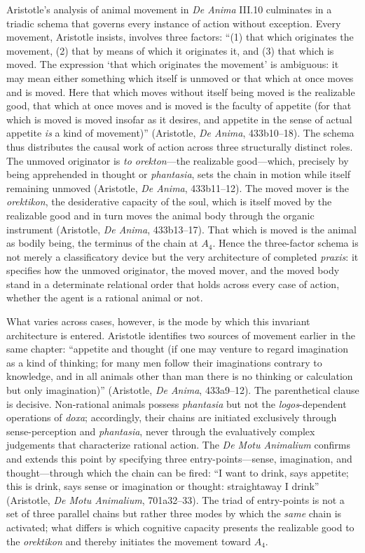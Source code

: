 Aristotle's analysis of animal movement in \textit{De Anima} III.10 culminates in a triadic schema that governs every instance of action without exception. Every movement, Aristotle insists, involves three factors: ``(1) that which originates the movement, (2) that by means of which it originates it, and (3) that which is moved. The expression `that which originates the movement' is ambiguous: it may mean either something which itself is unmoved or that which at once moves and is moved. Here that which moves without itself being moved is the realizable good, that which at once moves and is moved is the faculty of appetite (for that which is moved is moved insofar as it desires, and appetite in the sense of actual appetite \textit{is} a kind of movement)'' (Aristotle, \textit{De Anima}, 433b10--18). The schema thus distributes the causal work of action across three structurally distinct roles. The unmoved originator is \textit{to orekton}---the realizable good---which, precisely by being apprehended in thought or \textit{phantasia}, sets the chain in motion while itself remaining unmoved (Aristotle, \textit{De Anima}, 433b11--12). The moved mover is the \textit{orektikon}, the desiderative capacity of the soul, which is itself moved by the realizable good and in turn moves the animal body through the organic instrument (Aristotle, \textit{De Anima}, 433b13--17). That which is moved is the animal as bodily being, the terminus of the chain at $A_4$. Hence the three-factor schema is not merely a classificatory device but the very architecture of completed \textit{praxis}: it specifies how the unmoved originator, the moved mover, and the moved body stand in a determinate relational order that holds across every case of action, whether the agent is a rational animal or not.

What varies across cases, however, is the mode by which this invariant architecture is entered. Aristotle identifies two sources of movement earlier in the same chapter: ``appetite and thought (if one may venture to regard imagination as a kind of thinking; for many men follow their imaginations contrary to knowledge, and in all animals other than man there is no thinking or calculation but only imagination)'' (Aristotle, \textit{De Anima}, 433a9--12). The parenthetical clause is decisive. Non-rational animals possess \textit{phantasia} but not the \textit{logos}-dependent operations of \textit{doxa}; accordingly, their chains are initiated exclusively through sense-perception and \textit{phantasia}, never through the evaluatively complex judgements that characterize rational action. The \textit{De Motu Animalium} confirms and extends this point by specifying three entry-points---sense, imagination, and thought---through which the chain can be fired: ``I want to drink, says appetite; this is drink, says sense or imagination or thought: straightaway I drink'' (Aristotle, \textit{De Motu Animalium}, 701a32--33). The triad of entry-points is not a set of three parallel chains but rather three modes by which the \textit{same} chain is activated; what differs is which cognitive capacity presents the realizable good to the \textit{orektikon} and thereby initiates the movement toward $A_4$.

